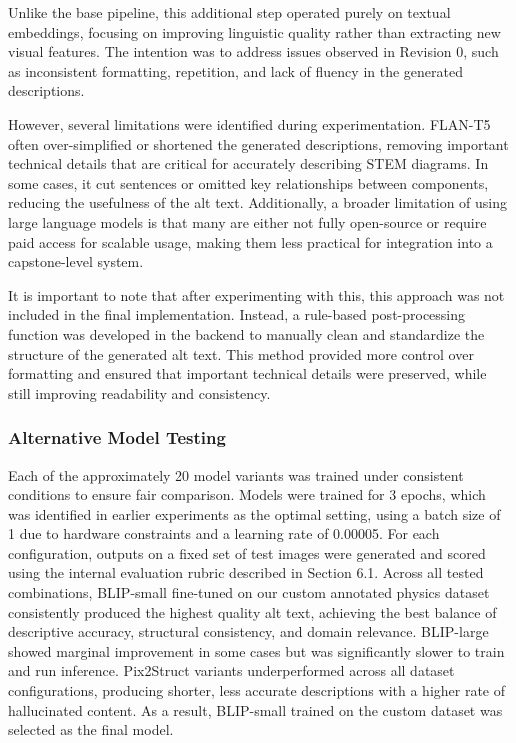 \documentclass[11pt]{article}
\begin{document}
Unlike the base pipeline, this additional step operated purely on textual embeddings, focusing on improving linguistic quality rather 
than extracting new visual features. The intention was to address issues observed in Revision 0, such as inconsistent formatting, 
repetition, and lack of fluency in the generated descriptions.

However, several limitations were identified during experimentation. FLAN-T5 often over-simplified or shortened the generated descriptions, 
removing important technical details that are critical for accurately describing STEM diagrams. In some cases, it cut sentences or omitted 
key relationships between components, reducing the usefulness of the alt text. Additionally, a broader limitation of using large language 
models is that many are either not fully open-source or require paid access for scalable usage, making them less practical for integration into a capstone-level system.

It is important to note that after experimenting with this, this approach was not included in the final implementation. Instead, a rule-based post-processing function was developed 
in the backend to manually clean and standardize the structure of the generated alt text. This method provided more control over formatting and 
ensured that important technical details were preserved, while still improving readability and consistency.

\subsubsection{Alternative Model Testing}
Each of the approximately 20 model variants was trained under consistent conditions to 
ensure fair comparison. Models were trained for 3 epochs, which was identified in earlier 
experiments as the optimal setting, using a batch size of 1 due to hardware constraints 
and a learning rate of 0.00005. For each configuration, outputs on a fixed set of test 
images were generated and scored using the internal evaluation rubric described in 
Section 6.1. Across all tested combinations, BLIP-small fine-tuned on our custom 
annotated physics dataset consistently produced the highest quality alt text, achieving 
the best balance of descriptive accuracy, structural consistency, and domain relevance. 
BLIP-large showed marginal improvement in some cases but was significantly slower to 
train and run inference. Pix2Struct variants underperformed across all dataset configurations, 
producing shorter, less accurate descriptions with a higher rate of hallucinated content. 
As a result, BLIP-small trained on the custom dataset was selected as the final model.
\end{document}
